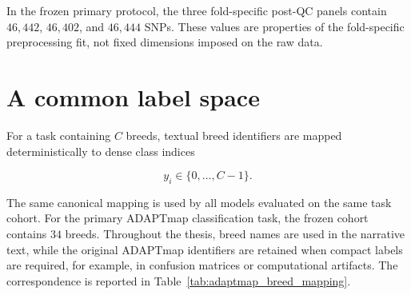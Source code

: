 In the frozen primary protocol, the three fold-specific post-QC
panels contain $46{,}442$, $46{,}402$, and $46{,}444$ SNPs. These values are
properties of the fold-specific preprocessing fit, not fixed
dimensions imposed on the raw data.

\section{A common label space}
\label{sec:canonical_labels}

For a task containing $C$ breeds, textual breed identifiers are
mapped deterministically to dense class indices

\begin{equation}
    y_i\in\{0,\ldots,C-1\}.
\end{equation}

The same canonical mapping is used by all models evaluated on the same
task cohort. For the primary ADAPTmap classification task, the frozen
cohort contains $34$ breeds. Throughout the thesis, breed names are used in
the narrative text, while the original ADAPTmap identifiers are
retained when compact labels are required, for example, in confusion
matrices or computational artifacts. The correspondence is reported
in Table~\ref{tab:adaptmap_breed_mapping}.

